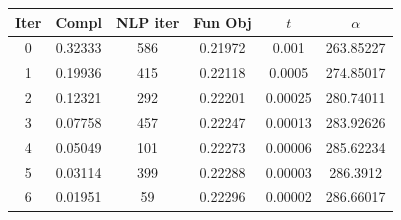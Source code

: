 \begin{tabular}{c c c c c c}
\toprule
Iter & Compl & NLP iter & Fun Obj & $t$ & $\alpha$ \\
\midrule
0 & 0.32333 & 586 & 0.21972 & 0.001 & 263.85227 \\
1 & 0.19936 & 415 & 0.22118 & 0.0005 & 274.85017 \\
2 & 0.12321 & 292 & 0.22201 & 0.00025 & 280.74011 \\
3 & 0.07758 & 457 & 0.22247 & 0.00013 & 283.92626 \\
4 & 0.05049 & 101 & 0.22273 & 0.00006 & 285.62234 \\
5 & 0.03114 & 399 & 0.22288 & 0.00003 & 286.3912 \\
6 & 0.01951 & 59 & 0.22296 & 0.00002 & 286.66017 \\
\bottomrule
\end{tabular}